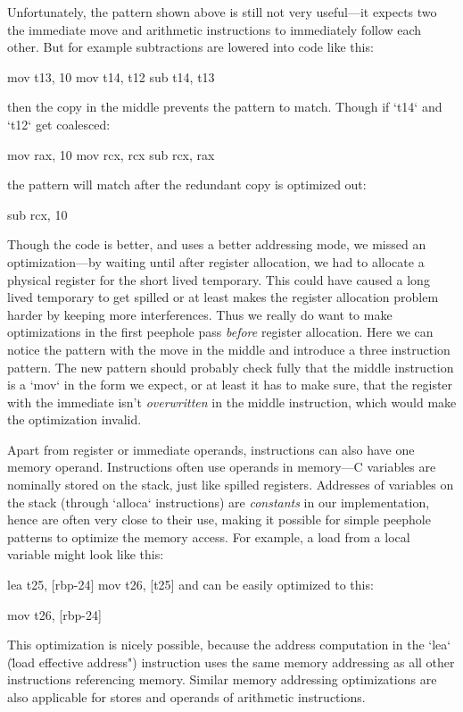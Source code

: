 Unfortunately, the pattern shown above is still not very useful---it expects two
the immediate move and arithmetic instructions to immediately follow each other.
But for example subtractions are lowered into code like this:

\begtt
mov t13, 10
mov t14, t12
sub t14, t13
\endtt

then the copy in the middle prevents the pattern to match. Though if `t14` and `t12`
get coalesced:

\begtt
mov rax, 10
mov rcx, rcx
sub rcx, rax
\endtt

the pattern will match after the redundant copy is optimized out:

\begtt
sub rcx, 10
\endtt

Though the code is better, and uses a better addressing mode, we missed an
optimization---by waiting until after register allocation, we had to allocate
a physical register for the short lived temporary. This could have caused a long
lived temporary to get spilled or at least makes the register allocation problem
harder by keeping more interferences. Thus we really do want to make
optimizations in the first peephole pass {\em before} register allocation. Here
we can notice the pattern with the move in the middle and introduce a three
instruction pattern. The new pattern should probably check fully that the middle
instruction is a `mov` in the form we expect, or at least it has to make sure,
that the register with the immediate isn't {\em overwritten} in the middle
instruction, which would make the optimization invalid.

Apart from register or immediate operands, instructions can also have one memory
operand. Instructions often use operands in memory---C variables are nominally
stored on the stack, just like spilled registers. Addresses of variables on the
stack (through `alloca` instructions) are {\em constants} in our implementation,
hence are often very close to their use, making it possible for simple peephole
patterns to optimize the memory access. For example, a load from a local
variable might look like this:

\begtt
lea t25, [rbp-24]
mov t26, [t25]
\endtt
%
and can be easily optimized to this:

\begtt
mov t26, [rbp-24]
\endtt

This optimization is nicely possible, because the address computation in the
`lea` (\"load effective address") instruction uses
the same memory addressing as all other instructions referencing memory. Similar
memory addressing optimizations are also applicable for stores and operands of
arithmetic instructions.

